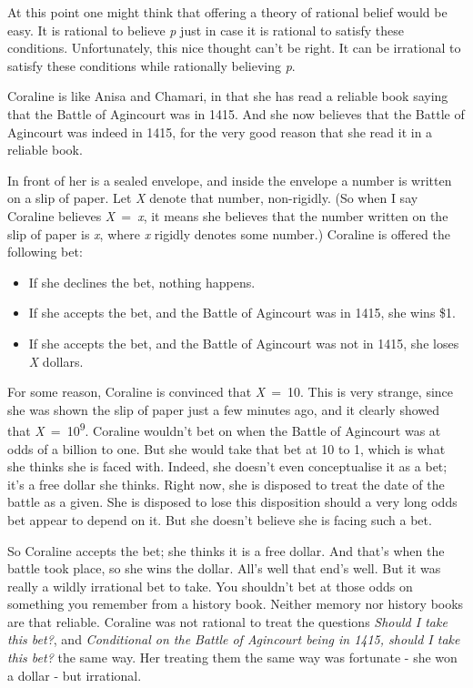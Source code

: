 \documentclass[
  11pt,
]{book}
\providecommand{\tightlist}{%
  \setlength{\itemsep}{0pt}\setlength{\parskip}{0pt}}
\begin{document}
At this point one might think that offering a theory of rational belief would be easy. It is rational to believe \emph{p} just in case it is rational to satisfy these conditions. Unfortunately, this nice thought can't be right. It can be irrational to satisfy these conditions while rationally believing \emph{p}.

Coraline is like Anisa and Chamari, in that she has read a reliable book saying that the Battle of Agincourt was in 1415. And she now believes that the Battle of Agincourt was indeed in 1415, for the very good reason that she read it in a reliable book.

In front of her is a sealed envelope, and inside the envelope a number is written on a slip of paper. Let \emph{X} denote that number, non-rigidly. (So when I say Coraline believes \emph{X}~=~\emph{x}, it means she believes that the number written on the slip of paper is \emph{x}, where \emph{x} rigidly denotes some number.) Coraline is offered the following bet:

\begin{itemize}
\tightlist
\item
  If she declines the bet, nothing happens.
\item
  If she accepts the bet, and the Battle of Agincourt was in 1415, she wins \$1.
\item
  If she accepts the bet, and the Battle of Agincourt was not in 1415, she loses \emph{X} dollars.
\end{itemize}

For some reason, Coraline is convinced that \emph{X}~=~10. This is very strange, since she was shown the slip of paper just a few minutes ago, and it clearly showed that \emph{X}~=~10\textsuperscript{9}. Coraline wouldn't bet on when the Battle of Agincourt was at odds of a billion to one. But she would take that bet at 10 to 1, which is what she thinks she is faced with. Indeed, she doesn't even conceptualise it as a bet; it's a free dollar she thinks. Right now, she is disposed to treat the date of the battle as a given. She is disposed to lose this disposition should a very long odds bet appear to depend on it. But she doesn't believe she is facing such a bet.

So Coraline accepts the bet; she thinks it is a free dollar. And that's when the battle took place, so she wins the dollar. All's well that end's well. But it was really a wildly irrational bet to take. You shouldn't bet at those odds on something you remember from a history book. Neither memory nor history books are that reliable. Coraline was not rational to treat the questions \emph{Should I take this bet?}, and \emph{Conditional on the Battle of Agincourt being in 1415, should I take this bet?} the same way. Her treating them the same way was fortunate - she won a dollar - but irrational.
\end{document}
